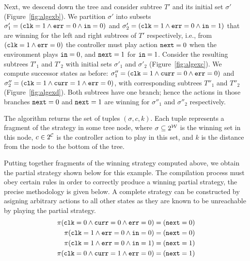 Next, we descend down the tree and consider subtree $T'$ and its initial set $\sigma'$ (Figure~\ref{fig:algexb}).  We partition $\sigma'$ into subsets $\sigma_1' = (\texttt{clk} = 1 \land \texttt{err} = 0 \land \texttt{in} = 0)$ and $\sigma_2' = (\texttt{clk} = 1 \land \texttt{err} = 0 \land \texttt{in} = 1)$ that are winning for the left and right subtrees of $T'$ respectively, i.e., from $(\texttt{clk} = 1 \land \texttt{err} = 0)$ the controller must play action $\texttt{next} = 0$ when the environment plays $\texttt{in} = 0$, and $\texttt{next} = 1$ for $\texttt{in} = 1$.  Consider the resulting subtrees $T'_1$ and $T'_2$ with initial sets $\sigma'_1$ and $\sigma'_2$ (Figure~\ref{fig:algexc}).  We compute successor states as before: $\sigma''_1 = (\texttt{clk} = 1 \land \texttt{curr} = 0 \land \texttt{err} = 0)$ and $\sigma''_2 = (\texttt{clk} = 1 \land \texttt{curr} = 1 \land \texttt{err} = 0)$, with corresponding subtrees $T''_1$ and $T''_2$ (Figure~\ref{fig:algexd}).  Both subtrees have one branch; hence the actions in those branches $\texttt{next} = 0$ and $\texttt{next} = 1$ are winning for $\sigma''_1$ and $\sigma''_2$ respectively.

The algorithm returns the set of tuples $(\sigma, c, k)$.  Each tuple represents a fragment of the strategy in some tree node, where $\sigma \subseteq 2^{\mathcal{W}}$ is the winning set in this node, $c \in 2^{\mathcal{C}}$ is the controller action to play in this set, and $k$ is the distance from the node to the bottom of the tree.

Putting together fragments of the winning strategy computed above, we obtain the partial strategy shown below for this example. The compilation process must obey certain rules in order to correctly produce a winning partial strategy, the precise methodology is given below.  A complete strategy can be constructed by asigning arbitrary actions to all other states as they are known to be unreachable by playing the partial strategy.
\begin{align*}
    \pi(\texttt{clk} = 0 \land \texttt{curr} = 0 \land \texttt{err} = 0) &= (\texttt{next} = 0) \\
    \pi(\texttt{clk} = 1 \land \texttt{err} = 0 \land \texttt{in} = 0) &= (\texttt{next} = 0) \\
    \pi(\texttt{clk} = 1 \land \texttt{err} = 0 \land \texttt{in} = 1) &= (\texttt{next} = 1) \\
    \pi(\texttt{clk} = 0 \land \texttt{curr} = 1 \land \texttt{err} = 0) &= (\texttt{next} = 1)
\end{align*}




